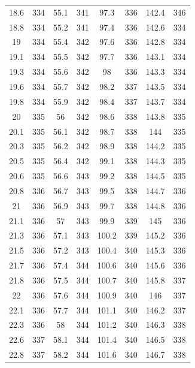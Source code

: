\documentclass[12pt]{ctexart}
\numberwithin{equation}{section}
\begin{document}
\begin{longtable}{cc|cc|cc|cc}
18.6  &  334  &  55.1  &  341  &  97.3  &  336  &  142.4  &  346  \\
18.8  &  334  &  55.2  &  341  &  97.4  &  336  &  142.6  &  334  \\
19  &  334  &  55.4  &  342  &  97.6  &  336  &  142.8  &  334  \\
19.1  &  334  &  55.5  &  342  &  97.7  &  336  &  143.1  &  334  \\
19.3  &  334  &  55.6  &  342  &  98  &  336  &  143.3  &  334  \\
19.6  &  334  &  55.7  &  342  &  98.2  &  337  &  143.5  &  334  \\
19.8  &  334  &  55.9  &  342  &  98.4  &  337  &  143.7  &  334  \\
20  &  335  &  56  &  342  &  98.6  &  338  &  143.8  &  335  \\
20.1  &  335  &  56.1  &  342  &  98.7  &  338  &  144  &  335  \\
20.3  &  335  &  56.2  &  342  &  98.9  &  338  &  144.2  &  335  \\
20.5  &  335  &  56.4  &  342  &  99.1  &  338  &  144.3  &  335  \\
20.6  &  335  &  56.6  &  343  &  99.2  &  338  &  144.5  &  335  \\
20.8  &  336  &  56.7  &  343  &  99.5  &  338  &  144.7  &  336  \\
21  &  336  &  56.9  &  343  &  99.7  &  338  &  144.8  &  336  \\
21.1  &  336  &  57  &  343  &  99.9  &  339  &  145  &  336  \\
21.3  &  336  &  57.1  &  343  &  100.2  &  339  &  145.2  &  336  \\
21.5  &  336  &  57.2  &  343  &  100.4  &  340  &  145.3  &  336  \\
21.7  &  336  &  57.4  &  344  &  100.6  &  340  &  145.6  &  336  \\
21.8  &  336  &  57.5  &  344  &  100.7  &  340  &  145.8  &  337  \\
22  &  336  &  57.6  &  344  &  100.9  &  340  &  146  &  337  \\
22.1  &  336  &  57.7  &  344  &  101.1  &  340  &  146.2  &  337  \\
22.3  &  336  &  58  &  344  &  101.2  &  340  &  146.3  &  338  \\
22.6  &  337  &  58.1  &  344  &  101.4  &  340  &  146.5  &  338  \\
22.8  &  337  &  58.2  &  344  &  101.6  &  340  &  146.7  &  338  \\

\end{longtable}
\end{document}
